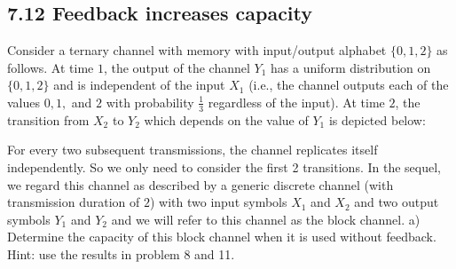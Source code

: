 \documentclass[../main.tex]{subfiles}
\begin{document}
\subsection*{7.12 Feedback increases capacity}
Consider a ternary channel with memory with input/output alphabet $\{0,1,2\}$ as follows. At time $1$, the output of the channel $Y_1$ has a uniform distribution on $\{0,1,2\}$ and is independent of the input $X_1$ (i.e., the channel outputs each of the values $0,1,$ and $2$ with probability $\frac{1}{3}$ regardless of the input). At time $2$, the transition from $X_2$ to $Y_2$ which depends on the value of $Y_1$ is depicted below:
\newline
{}
\newline 
For every two subsequent transmissions, the channel replicates itself independently. So we only need to consider the first 2 transitions. In the sequel, we regard this channel as described by a generic discrete channel (with transmission duration of $2$) with two input symbols $X_1$ and $X_2$ and two output symbols $Y_1$ and $Y_2$
 and we will refer to this channel as the block channel.
a) Determine the capacity of this block channel when it is used without feedback. Hint: use the results in problem 8 and 11.
\end{document}
